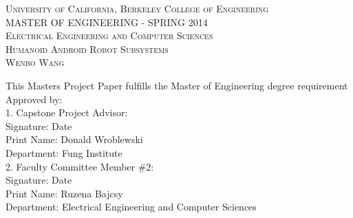 \begin{titlepage}
\begin{center}


    \textsc{\large University of California, Berkeley College of Engineering}\\[0.5cm]
    \textsc{\Large MASTER OF ENGINEERING - SPRING 2014}\\[1.5cm]

    \textsc{\large Electrical Engineering and Computer Sciences}\\[0.5cm]
    \textsc{\LARGE Humanoid Android Robot Subsystems}\\[0.5cm] 
    \textsc{\LARGE Wenbo Wang}\\[1.5cm]

\end{center}

\begin{flushleft}
{
    This Masters Project Paper fulfills the Master of Engineering degree
    requirement\\[0.5cm]
    Approved by:\\[0.5cm]
    1.  Capstone Project Advisor: \\[0.5cm]
    Signature: \underline{\hspace{7cm}} Date \underline{\hspace{3cm}}\\[0.5cm]
    Print Name: Donald Wroblewski\\
    Department: Fung Institute\\[1.5cm]

    2. Faculty Committee Member \#2: \\[0.5cm]
    Signature: \underline{\hspace{7cm}} Date \underline{\hspace{3cm}}\\[0.5cm]
    Print Name: Ruzena Bajcsy\\
    Department: Electrical Engineering and Computer Sciences\\
}
\end{flushleft}

\end{titlepage}
